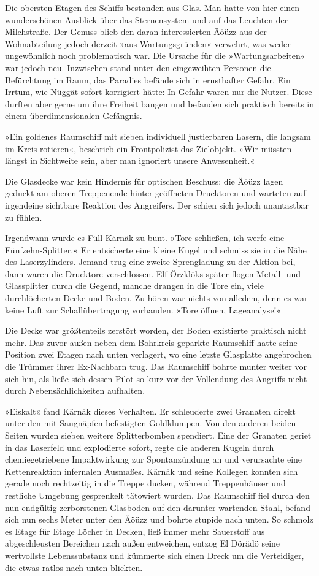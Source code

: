 Die obersten Etagen des Schiffs bestanden aus Glas. Man hatte von hier einen wunderschönen Ausblick über das Sternensystem und auf das Leuchten der Milchstraße. Der Genuss blieb den daran interessierten Äöüzz aus der Wohnabteilung jedoch derzeit »aus Wartungsgründen« verwehrt, was weder ungewöhnlich noch problematisch war. Die Ursache für die »Wartungsarbeiten« war jedoch neu. Inzwischen stand unter den eingeweihten Personen die Befürchtung im Raum, das Paradies befände sich in ernsthafter Gefahr. Ein Irrtum, wie Nüggät sofort korrigiert hätte: In Gefahr waren nur die Nutzer. Diese durften aber gerne um ihre Freiheit bangen und befanden sich praktisch bereits in einem überdimensionalen Gefängnis.

»Ein goldenes Raumschiff mit sieben individuell justierbaren Lasern, die langsam im Kreis rotieren«, beschrieb ein Frontpolizist das Zielobjekt. »Wir müssten längst in Sichtweite sein, aber man ignoriert unsere Anwesenheit.«

Die Glasdecke war kein Hindernis für optischen Beschuss; die Äöüzz lagen geduckt am oberen Treppenende hinter geöffneten Drucktoren und warteten auf irgendeine sichtbare Reaktion des Angreifers. Der schien sich jedoch unantastbar zu fühlen.

Irgendwann wurde es Füll Kärnäk zu bunt. »Tore schließen, ich werfe eine Fünfzehn-Splitter.« Er entsicherte eine kleine Kugel und schmiss sie in die Nähe des Laserzylinders. Jemand trug eine zweite Sprengladung zu der Aktion bei, dann waren die Drucktore verschlossen. Elf Örzklöks später flogen Metall- und Glassplitter durch die Gegend, manche drangen in die Tore ein, viele durchlöcherten Decke und Boden. Zu hören war nichts von alledem, denn es war keine Luft zur Schallübertragung vorhanden. »Tore öffnen, Lageanalyse!«

Die Decke war größtenteils zerstört worden, der Boden existierte praktisch nicht mehr. Das zuvor außen neben dem Bohrkreis geparkte Raumschiff hatte seine Position zwei Etagen nach unten verlagert, wo eine letzte Glasplatte angebrochen die Trümmer ihrer Ex-Nachbarn trug. Das Raumschiff bohrte munter weiter vor sich hin, als ließe sich dessen Pilot so kurz vor der Vollendung des Angriffs nicht durch Nebensächlichkeiten aufhalten.

»Eiskalt« fand Kärnäk dieses Verhalten. Er schleuderte zwei Granaten direkt unter den mit Saugnäpfen befestigten Goldklumpen. Von den anderen beiden Seiten wurden sieben weitere Splitterbomben spendiert. Eine der Granaten geriet in das Laserfeld und explodierte sofort, regte die anderen Kugeln durch chemiegetriebene Impaktwirkung zur Spontanzündung an und verursachte eine Kettenreaktion infernalen Ausmaßes. Kärnäk und seine Kollegen konnten sich gerade noch rechtzeitig in die Treppe ducken, während Treppenhäuser und restliche Umgebung gesprenkelt tätowiert wurden. Das Raumschiff fiel durch den nun endgültig zerborstenen Glasboden auf den darunter wartenden Stahl, befand sich nun sechs Meter unter den Äöüzz und bohrte stupide nach unten. So schmolz es Etage für Etage Löcher in Decken, ließ immer mehr Sauerstoff aus abgeschleusten Bereichen nach außen entweichen, entzog El Dörädö seine wertvollste Lebenssubstanz und kümmerte sich einen Dreck um die Verteidiger, die etwas ratlos nach unten blickten.

